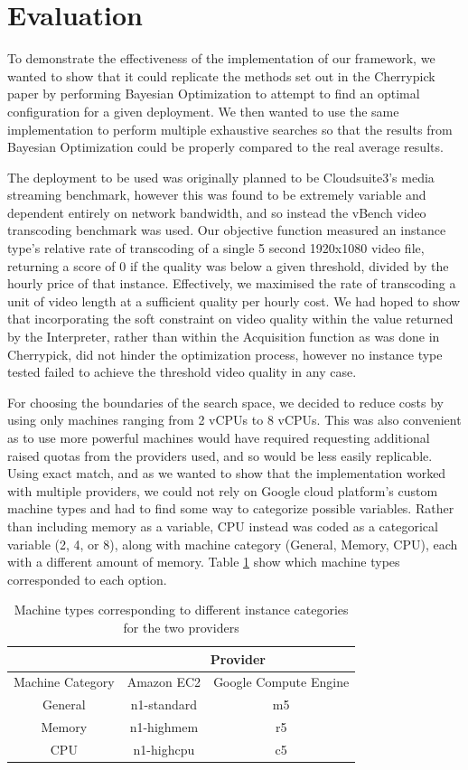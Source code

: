 \documentclass{article}
\begin{document}
\section{Evaluation}
To demonstrate the effectiveness of the implementation of our framework, we wanted to show that it could replicate the methods set out in the Cherrypick paper \cite{Alipourfard2017} by performing Bayesian Optimization to attempt to find an optimal configuration for a given deployment. We then wanted to use the same implementation to perform multiple exhaustive searches so that the results from Bayesian Optimization could be properly compared to the real average results. 

The deployment to be used was originally planned to be Cloudsuite3's media streaming benchmark, however this was found to be extremely variable and dependent entirely on network bandwidth, and so instead the vBench video transcoding benchmark was used. Our objective function measured an instance type's relative rate of transcoding of a single 5 second 1920x1080 video file, returning a score of 0 if the quality was below a given threshold, divided by the hourly price of that instance. Effectively, we maximised the rate of transcoding a unit of video length at a sufficient quality per hourly cost. We had hoped to show that incorporating the soft constraint on video quality within the value returned by the Interpreter, rather than within the Acquisition function as was done in Cherrypick, did not hinder the optimization process, however no instance type tested failed to achieve the threshold video quality in any case.

For choosing the boundaries of the search space, we decided to reduce costs by using only machines ranging from 2 vCPUs to 8 vCPUs. This was also convenient as to use more powerful machines would have required requesting additional raised quotas from the providers used, and so would be less easily replicable. Using exact match, and as we wanted to show that the implementation worked with multiple providers, we could not rely on Google cloud platform's custom machine types and had to find some way to categorize possible variables. Rather than including memory as a variable, CPU instead was coded as a categorical variable (2, 4, or 8), along with machine category (General, Memory, CPU), each with a different amount of memory. Table \ref{tab:instance-types} show which machine types corresponded to each option. 

\begin{table}
\centering
\begin{tabular}{ |c||c|c|  }
 \hline
 & \multicolumn{2}{|c|}{Provider} \\
 \hline
 Machine Category & Amazon EC2 & Google Compute Engine \\
 \hline
 General& n1-standard & m5\\
 Memory & n1-highmem  & r5\\
 CPU    & n1-highcpu  & c5\\
 \hline
\end{tabular}
\caption{Machine types corresponding to different instance categories for the two providers}
\label{tab:instance-types}
\end{table}
\end{document}
